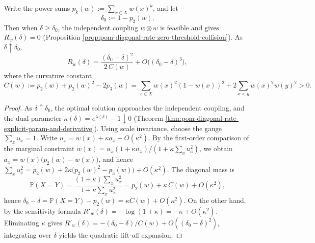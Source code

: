 \begin{theorem}\label{thm:pom-diagonal-rate-zero-rate-endpoint-quadratic-curvature}
Write the power sums \(p_k(w):=\sum_{x\in X}w(x)^k\), and let
\[
\delta_0:=1-p_2(w).
\]
Then when \(\delta\ge\delta_0\), the independent coupling \(w\otimes w\) is feasible and gives \(R_w(\delta)=0\) (Proposition \ref{prop:pom-diagonal-rate-zero-threshold-collision}).
As \(\delta\uparrow\delta_0\),
\[
R_w(\delta)=\frac{(\delta_0-\delta)^2}{2\,C(w)}+O\bigl((\delta_0-\delta)^3\bigr),
\]
where the curvature constant
\[
C(w):=p_2(w)+p_2(w)^2-2p_3(w)
=\sum_{x\in X}w(x)^2(1-w(x))^2+2\sum_{x<y}w(x)^2w(y)^2>0.
\]
\end{theorem}
\begin{proof}
As \(\delta\uparrow\delta_0\), the optimal solution approaches the independent coupling, and the dual parameter \(\kappa(\delta)=e^{\lambda(\delta)}-1\downarrow 0\) (Theorem \ref{thm:pom-diagonal-rate-explicit-param-and-derivative}).
Using scale invariance, choose the gauge \(\sum_x u_x=1\).
Write
\(
u_x=w(x)+\kappa a_x+O(\kappa^2)
\).
By the first-order comparison of the marginal constraint
\(
w(x)=u_x(1+\kappa u_x)/(1+\kappa\sum_a u_a^2)
\),
we obtain
\(
a_x=w(x)\bigl(p_2(w)-w(x)\bigr)
\),
and hence
\(
\sum_x u_x^2=p_2(w)+2\kappa\bigl(p_2(w)^2-p_3(w)\bigr)+O(\kappa^2)
\).
The diagonal mass is
\[
\mathbb P(X=Y)=\frac{(1+\kappa)\sum_x u_x^2}{1+\kappa\sum_x u_x^2}
=p_2(w)+\kappa\,C(w)+O(\kappa^2),
\]
hence
\(
\delta_0-\delta=\mathbb P(X=Y)-p_2(w)=\kappa C(w)+O(\kappa^2)
\).
On the other hand, by the sensitivity formula
\(
R'_w(\delta)=-\log(1+\kappa)=-\kappa+O(\kappa^2)
\).
Eliminating \(\kappa\) gives
\(
R'_w(\delta)=-(\delta_0-\delta)/C(w)+O((\delta_0-\delta)^2)
\),
integrating over \(\delta\) yields the quadratic lift-off expansion.
\end{proof}


